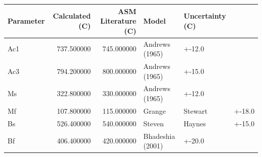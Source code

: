 \begin{tabular}{lrrll}
\toprule
Parameter & Calculated (C) & ASM Literature (C) & Model & Uncertainty (C) \\
\midrule
Ac1 & 737.500000 & 745.000000 & Andrews (1965) & +-12.0 \\
Ac3 & 794.200000 & 800.000000 & Andrews (1965) & +-15.0 \\
Ms & 322.800000 & 330.000000 & Andrews (1965) & +-12.0 \\
Mf & 107.800000 & 115.000000 & Grange & Stewart & +-18.0 \\
Bs & 526.400000 & 540.000000 & Steven & Haynes & +-15.0 \\
Bf & 406.400000 & 420.000000 & Bhadeshia (2001) & +-20.0 \\
\bottomrule
\end{tabular}
